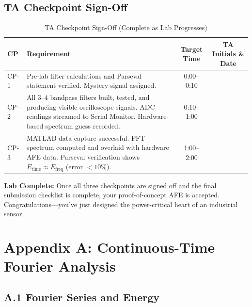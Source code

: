 \documentclass[11pt,letterpaper]{article}
\begin{document}
\subsection{TA Checkpoint Sign-Off}

\begin{table}[H]
    \centering
    \caption{TA Checkpoint Sign-Off (Complete as Lab Progresses)}
    \label{tab:checkpoints}
    \begin{tabularx}{\linewidth}{l X c c}
    \toprule
    \textbf{CP} & \textbf{Requirement} & \textbf{Target Time} & \textbf{TA Initials \& Date}\\
    \midrule
    CP-1 & Pre-lab filter calculations and Parseval statement verified. Mystery signal assigned. & 0:00--0:10 & \underline{\hspace{2.5cm}} \\[0.1in]
    CP-2 & All 3--4 bandpass filters built, tested, and producing visible oscilloscope signals. ADC readings streamed to Serial Monitor. Hardware-based spectrum guess recorded. & 0:10--1:00 & \underline{\hspace{2.5cm}} \\[0.1in]
    CP-3 & MATLAB data capture successful. FFT spectrum computed and overlaid with hardware AFE data. Parseval verification shows $E_{\text{time}} \approx E_{\text{freq}}$ (error $< 10\%$). & 1:00--2:00 & \underline{\hspace{2.5cm}} \\[0.1in]
    \bottomrule
    \end{tabularx}
\end{table}

\noindent
\textbf{Lab Complete:} Once all three checkpoints are signed off and the final submission checklist is complete, your proof-of-concept AFE is accepted. Congratulations—you've just designed the power-critical heart of an industrial sensor.

\clearpage

\section*{Appendix A: Continuous-Time Fourier Analysis}

\subsection*{A.1 Fourier Series and Energy}
\end{document}
